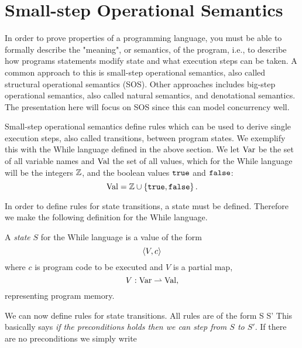 \section{Small-step Operational Semantics} \label{sec:language_semantics}

In order to prove properties of a programming language, you must be able to
formally describe the "meaning", or semantics, of the program, i.e., to describe
how programs statements modify state and what execution steps can be taken. A
common approach to this is small-step operational semantics, also called
structural operational semantics (SOS). Other approaches includes big-step
operational semantics, also called natural semantics, and denotational
semantics. The presentation here will focus on SOS since this can model
concurrency well. 

Small-step operational semantics define rules which can be used to derive
single execution steps, also called transitions, between program states. We
exemplify this with the While language defined in the above section.  We let
$\mbox{$\mathrm{Var}$}$ be the set of all variable names and $\mbox{$\mathrm{Val}$}$ the set of all values,
which for the While language will be the integers $\mathbb{Z}$, and the boolean
values $\mbox{\texttt{true}}$ and $\mbox{\texttt{false}}$:
\begin{equation*}
  \mbox{$\mathrm{Val}$} = \mathbb{Z} \cup \left\{ \mbox{\texttt{true}}, \mbox{\texttt{false}} \right\}.
\end{equation*}

In order to define rules for state transitions, a state must be defined.
Therefore we make the following definition for the While language.

\begin{definition}
  A \emph{state} $S$ for the While language is a value of the form
  \begin{equation*}
    \langle V, c \rangle  
  \end{equation*}
  where $c$ is program code to be executed and $V$ is a partial map,
  \begin{equation*}
    V: \mbox{$\mathrm{Var}$} \rightharpoonup \mbox{$\mathrm{Val}$},
  \end{equation*}
  representing program memory.
\end{definition}

We can now define rules for state transitions.
All rules are of the form
{S \rightarrow S'}
This basically says {\it if the preconditions holds then we can step from $S$ to
$S'$}. If there are no preconditions we simply write

